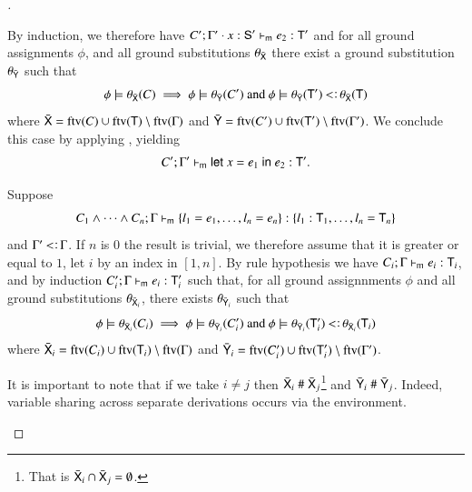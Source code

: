 \documentclass{report}
\begin{document}
\begin{proof}[]
\begin{indcase}{\sdlet}
      By induction, we therefore have $C';\Gamma'\cdot x:\textsf{S}'\vdash_\textsf{m} e_2:\textsf{T}'$ and for all
      ground assignments $\phi$, and all ground substitutions $\theta_{\bar{\textsf{X}}}$ there
      exist a ground substitution $\theta_{\bar{\textsf{Y}}}$ such that
      \begin{displaymath}
        \phi\csat\theta_{\bar{\type{X}}}(C) \implies \phi\csat \theta_{\bar{\type{Y}}}(C')\textrm{ and }
        \phi\csat\theta_{\bar{\type{Y}}}(\type{T}')\subtype\theta_{\bar{\type{X}}}(\type{T})
      \end{displaymath}
      where $\bar{\textsf{X}}=\mathop{\rm ftv}\nolimits(C)\cup\mathop{\rm ftv}\nolimits(\textsf{T})\setminus\mathop{\rm ftv}\nolimits(\Gamma)$ and
      $\bar{\textsf{Y}}=\mathop{\rm ftv}\nolimits(C')\cup\mathop{\rm ftv}\nolimits(\textsf{T}')\setminus\mathop{\rm ftv}\nolimits(\Gamma')$.
      We conclude this case by applying \sdlet, yielding
      \begin{displaymath}
        C';\Gamma'\vdash_\textsf{m} \textsf{let }{x}={e_1}\textsf{ in }{e_2}:\textsf{T}'\textrm{.}
      \end{displaymath}
    \end{indcase}
    \begin{indcase}{\sdrec}
      Suppose
      \begin{displaymath}
        C_1\land\cdots\land C_n; \Gamma\vdash_\textsf{m}\left\{l_1=e_1,\ldots,l_n=e_n\right\}:\left\{l_1:\textsf{T}_1,\ldots,l_n=\textsf{T}_n\right\}
      \end{displaymath}
      and $\Gamma'\subtype\Gamma$.
      If $n$ is $0$ the result is trivial, we therefore assume that it is greater or equal to $1$,
      let $i$ by an index in $[1,n]$.
      By rule hypothesis we have $C_i;\Gamma\vdash_\textsf{m} e_i:\textsf{T}_i$, and by induction
      $C_i';\Gamma\vdash_\textsf{m} e_i:\textsf{T}_i'$ such that, for all ground assignnments $\phi$ and all
      ground substitutions $\theta_{\bar{\textsf{X}}_i}$, there exists $\theta_{\bar{\textsf{Y}}_i}$
      such that
      \begin{displaymath}
        \phi\csat\theta_{\bar{\type{X}}_i}(C_i) \implies
        \phi\csat\theta_{\bar{\type{Y}}_i}(C_i')\textrm{ and }
        \phi\csat\theta_{\bar{\type{Y}}_i}(\type{T}_i')\subtype\theta_{\bar{\type{X}}_i}(\type{T}_i)
	  \end{displaymath}
	  where $\bar{\textsf{X}}_i=\mathop{\rm ftv}\nolimits(C_i)\cup\mathop{\rm ftv}\nolimits(\textsf{T}_i)\setminus\mathop{\rm ftv}\nolimits(\Gamma)$ and
	  $\bar{\textsf{Y}}_i=\mathop{\rm ftv}\nolimits(C_i')\cup\mathop{\rm ftv}\nolimits(\textsf{T}_i')\setminus\mathop{\rm ftv}\nolimits(\Gamma')$.
	  
	  It is important
	  to note that if we take $i\ne j$ then $\bar{\textsf{X}}_i\mathrel{\#}\bar{\textsf{X}}_j$\footnote{
	    That is $\bar{\textsf{X}}_i\cap\bar{\textsf{X}}_j=\emptyset$.}
	  and $\bar{\textsf{Y}}_i\mathrel{\#}\bar{\textsf{Y}}_j$.
	  Indeed, variable sharing across separate derivations occurs via the environment.
	  

\end{indcase}
\end{proof}
\end{document}
